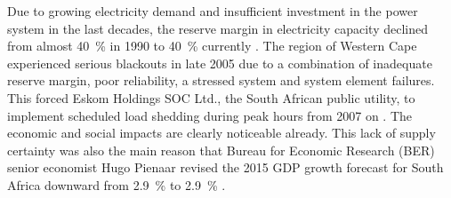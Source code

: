 
Due to growing electricity demand and insufficient investment in the power system in the last decades, the reserve margin in electricity capacity declined from almost \SI{40}{\percent} in 1990 to \SI{40}{\percent} currently \cite{Trollip2014,Eskom2015}. The region of Western Cape experienced serious blackouts in late 2005 due to a combination of inadequate reserve margin, poor reliability, a stressed system and system element failures. This forced Eskom Holdings SOC Ltd., the South African public utility, to implement scheduled load shedding during peak hours from 2007 on \cite{Trollip2014}. The economic and social impacts are clearly noticeable already. This lack of supply certainty was also the main reason that Bureau for Economic Research (BER) senior economist Hugo Pienaar revised the 2015 GDP growth forecast for South Africa downward from \SI{2.9}{\percent} to \SI{2.9}{\percent} \cite{Bisseker2015}.


